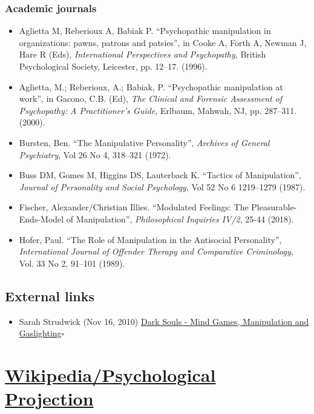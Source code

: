 \documentclass{book}
\numberwithin{equation}{section}
\begin{document}
\subsection{Academic journals}
\begin{itemize}
    \item Aglietta M, Reberioux A, Babiak P. ``Psychopathic manipulation in organizations: pawns, patrons and patsies'', in Cooke A, Forth A, Newman J, Hare R (Eds), \textit{International Perspectives and Psychopathy}, British Psychological Society, Leicester, pp. 12--17. (1996).
    \item Aglietta, M.; Reberioux, A.; Babiak, P. ``Psychopathic manipulation at work'', in Gacono, C.B. (Ed), \textit{The Clinical and Forensic Assessment of Psychopathy: A Practitioner's Guide}, Erlbaum, Mahwah, NJ, pp. 287--311. (2000).
    \item Bursten, Ben. ``The Manipulative Personality'', \textit{Archives of General Psychiatry}, Vol 26 No 4, 318--321 (1972).
    \item Buss DM, Gomes M, Higgins DS, Lauterback K. ``Tactics of Manipulation'', \textit{Journal of Personality and Social Psychology}, Vol 52 No 6 1219--1279 (1987).
    \item Fischer, Alexander/Christian Illies. ``Modulated Feelings: The Pleasurable-Ends-Model of Manipulation'', \textit{Philosophical Inquiries IV/2}, 25-44 (2018).
    \item Hofer, Paul. ``The Role of Manipulation in the Antisocial Personality'', \textit{International Journal of Offender Therapy and Comparative Criminology}, Vol. 33 No 2, 91--101 (1989).
\end{itemize}

\section{External links}
\begin{itemize}
    \item Sarah Strudwick (Nov 16, 2010) \href{https://www.youtube.com/watch?v=PwWBHRKFYCA}{Dark Souls - Mind Games, Manipulation and Gaslighting}\hfill$\square$
\end{itemize}


\chapter{\href{https://en.wikipedia.org/wiki/Psychological_projection}{Wikipedia/Psychological Projection}}
\end{document}
